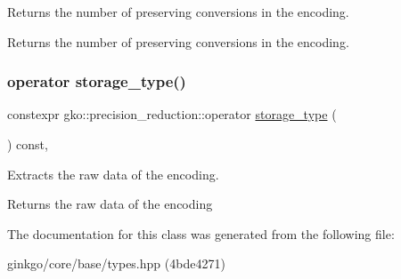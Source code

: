 Returns the number of preserving conversions in the encoding. 

\begin{DoxyReturn}{Returns}
the number of preserving conversions in the encoding. 
\end{DoxyReturn}
\mbox{\label{classgko_1_1precision__reduction_a3ee4da03be089565f7ab91b553d7738f}} 
\subsubsection{\texorpdfstring{operator storage\+\_\+type()}{operator storage\_type()}}
{\footnotesize\ttfamily constexpr gko\+::precision\+\_\+reduction\+::operator \hyperlink{classgko_1_1precision__reduction_a2a1a94a27fa69b4cc321136b56e7b7d9}{storage\+\_\+type} (\begin{DoxyParamCaption}{ }\end{DoxyParamCaption}) const\hspace{0.3cm}{\ttfamily [inline]}, {\ttfamily [noexcept]}}



Extracts the raw data of the encoding. 

\begin{DoxyReturn}{Returns}
the raw data of the encoding 
\end{DoxyReturn}


The documentation for this class was generated from the following file\+:\begin{DoxyCompactItemize}
\item 
ginkgo/core/base/types.\+hpp (4bde4271)\end{DoxyCompactItemize}
